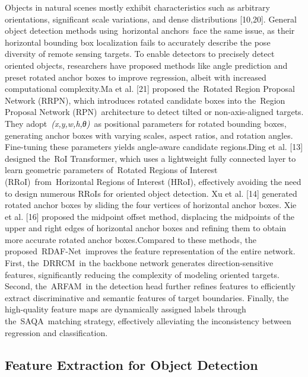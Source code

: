 \documentclass[journal]{IEEEtran}
\begin{document}
Objects in natural scenes mostly exhibit characteristics such as arbitrary orientations, significant scale variations, and dense distributions [10,20]. General object detection methods using horizontal anchors face the same issue, as their horizontal bounding box localization fails to accurately describe the pose diversity of remote sensing targets. To enable detectors to precisely detect oriented objects, researchers have proposed methods like angle prediction and preset rotated anchor boxes to improve regression, albeit with increased computational complexity.Ma et al. [21] proposed the Rotated Region Proposal Network (RRPN), which introduces rotated candidate boxes into the Region Proposal Network (RPN) architecture to detect tilted or non-axis-aligned targets. They adopt \textit{(x,y,w,h,θ)} as positional parameters for rotated bounding boxes, generating anchor boxes with varying scales, aspect ratios, and rotation angles. Fine-tuning these parameters yields angle-aware candidate regions.Ding et al. [13] designed the RoI Transformer, which uses a lightweight fully connected layer to learn geometric parameters of Rotated Regions of Interest (RRoI) from Horizontal Regions of Interest (HRoI), effectively avoiding the need to design numerous RRoIs for oriented object detection. Xu et al. [14] generated rotated anchor boxes by sliding the four vertices of horizontal anchor boxes. Xie et al. [16] proposed the midpoint offset method, displacing the midpoints of the upper and right edges of horizontal anchor boxes and refining them to obtain more accurate rotated anchor boxes.Compared to these methods, the proposed RDAF-Net improves the feature representation of the entire network. First, the DRRCM in the backbone network generates direction-sensitive features, significantly reducing the complexity of modeling oriented targets. Second, the ARFAM in the detection head further refines features to efficiently extract discriminative and semantic features of target boundaries. Finally, the high-quality feature maps are dynamically assigned labels through the SAQA matching strategy, effectively alleviating the inconsistency between regression and classification.

\subsection{ Feature Extraction for Object Detection }
\end{document}
